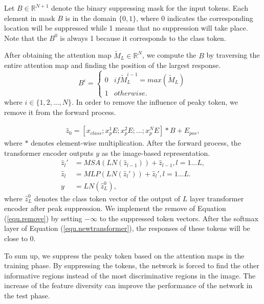 \documentclass[5p,twocolumn]{elsarticle}
\begin{document}
Let $B \in \mathbb{R}^{N+1}$ denote the binary suppressing mask for the input tokens. Each element in mask $B$ is in the domain $\{0, 1\}$, where 0 indicates the corresponding location will be suppressed while 1 means that no suppression will take place. Note that the $B^{0}$ is always 1 because it corresponds to the class token. 

After obtaining the attention map $\tilde{M}_{L}\in \mathbb{R}^{N}$, we compute the $B$ by traversing the entire attention map and finding the position of the largest response.
\begin{equation}\label{equ.findp}
B^{i} =\left\{\begin{matrix}

0 &  if  \tilde{M}_{L}^{i-1} = max(\tilde{M}_{L}) \\  
1 &  otherwise. 
\end{matrix}\right. 
\end{equation}
where  $i \in \{1, 2, ..., N\}$. In order to remove the influence of peaky token, we remove it from the forward process. 

\begin{equation}\label{equ.remove}
\begin{aligned}
\hat{z}_{0} = [x_{class};x_{p}^{1}E;x_{p}^{2}E;...;x_{p}^NE] * B + E_{pos},
\end{aligned}
\end{equation}
where $*$ denotes element-wise multiplication. After the forward process, the transformer encoder outputs $y$ as the image-based representation.
\begin{equation}\label{equ.newtransformer}
\begin{aligned}
\hat{z}_{l}' &= MSA(LN(\hat{z}_{l-1})) + \hat{z}_{l-1}, l = 1...L, \\
\hat{z}_{l} &= MLP(LN(\hat{z}_{l}')) + \hat{z}_{l}', l = 1...L.\\
y &= LN(\hat{z}_{L}^{0}),
\end{aligned}
\end{equation}
where $\hat{z}_{L}^{0}$ denotes the class token vector of the output of $L$ layer transformer encoder after peak suppression.
We implement the remove of Equation (\ref{equ.remove}) by setting $-\infty$ to the suppressed token vectors.
After the softmax layer of Equation (\ref{equ.newtransformer}), the responses of these tokens will be close to 0. 

To sum up, we suppress the peaky token based on the attention maps in the training phase.  By suppressing the tokens, the network is forced to find the other informative regions instead of the most discriminative regions in the image. The increase of the feature diversity can improve the performance of the network in the test phase.
\end{document}
